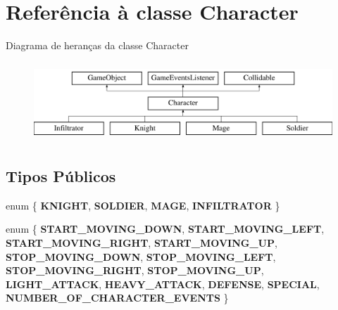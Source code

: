 \hypertarget{classCharacter}{}\section{Referência à classe Character}
\label{classCharacter}
Diagrama de heranças da classe Character\begin{figure}[H]
\begin{center}
\leavevmode
\includegraphics[height=3.000000cm]{classCharacter}
\end{center}
\end{figure}
\subsection*{Tipos Públicos}
\begin{DoxyCompactItemize}
\item 
\mbox{\label{classCharacter_abf5e238c65ecb4480e6e5389e011a4d6}} 
enum \{ {\bfseries K\+N\+I\+G\+HT}, 
{\bfseries S\+O\+L\+D\+I\+ER}, 
{\bfseries M\+A\+GE}, 
{\bfseries I\+N\+F\+I\+L\+T\+R\+A\+T\+OR}
 \}
\item 
\mbox{\label{classCharacter_ad3319cdd6aad27544714551aba4d4075}} 
enum \{ \newline
{\bfseries S\+T\+A\+R\+T\+\_\+\+M\+O\+V\+I\+N\+G\+\_\+\+D\+O\+WN}, 
{\bfseries S\+T\+A\+R\+T\+\_\+\+M\+O\+V\+I\+N\+G\+\_\+\+L\+E\+FT}, 
{\bfseries S\+T\+A\+R\+T\+\_\+\+M\+O\+V\+I\+N\+G\+\_\+\+R\+I\+G\+HT}, 
{\bfseries S\+T\+A\+R\+T\+\_\+\+M\+O\+V\+I\+N\+G\+\_\+\+UP}, 
\newline
{\bfseries S\+T\+O\+P\+\_\+\+M\+O\+V\+I\+N\+G\+\_\+\+D\+O\+WN}, 
{\bfseries S\+T\+O\+P\+\_\+\+M\+O\+V\+I\+N\+G\+\_\+\+L\+E\+FT}, 
{\bfseries S\+T\+O\+P\+\_\+\+M\+O\+V\+I\+N\+G\+\_\+\+R\+I\+G\+HT}, 
{\bfseries S\+T\+O\+P\+\_\+\+M\+O\+V\+I\+N\+G\+\_\+\+UP}, 
\newline
{\bfseries L\+I\+G\+H\+T\+\_\+\+A\+T\+T\+A\+CK}, 
{\bfseries H\+E\+A\+V\+Y\+\_\+\+A\+T\+T\+A\+CK}, 
{\bfseries D\+E\+F\+E\+N\+SE}, 
{\bfseries S\+P\+E\+C\+I\+AL}, 
\newline
{\bfseries N\+U\+M\+B\+E\+R\+\_\+\+O\+F\+\_\+\+C\+H\+A\+R\+A\+C\+T\+E\+R\+\_\+\+E\+V\+E\+N\+TS}
 \}
\end{DoxyCompactItemize}
